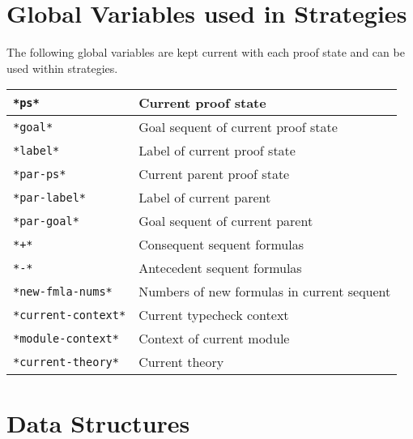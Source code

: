 \documentclass[12pt,twoside]{book}
\makeatletter
\newcommand{\indtt}[1]{\texttt{#1}\index{#1@{\texttt{#1}}}}  %
\makeatother
\begin{document}
\section{Global Variables used in Strategies}

The following global variables are kept current with each proof state
and can be used within strategies.  

\noindent
\begin{tabularx}{\textwidth}{|l|X|}
\hline
\indtt{*ps*} & Current proof state \\\hline
\indtt{*goal*} & Goal sequent of current proof state \\\hline
\indtt{*label*} & Label of current proof state  \\\hline
\indtt{*par-ps*} & Current parent proof state \\\hline
\indtt{*par-label*} & Label of current parent \\\hline
\indtt{*par-goal*} & Goal sequent of current parent \\\hline
\indtt{*+*} & Consequent sequent formulas \\\hline
\indtt{*-*} & Antecedent sequent formulas \\\hline
\indtt{*new-fmla-nums*} &  Numbers of new formulas in current sequent
\\\hline
\indtt{*current-context*} & Current typecheck context \\\hline
\indtt{*module-context*} & Context of current module \\\hline
\indtt{*current-theory*} & Current theory \\\hline 
\end{tabularx}

\section{Data Structures}
\end{document}
